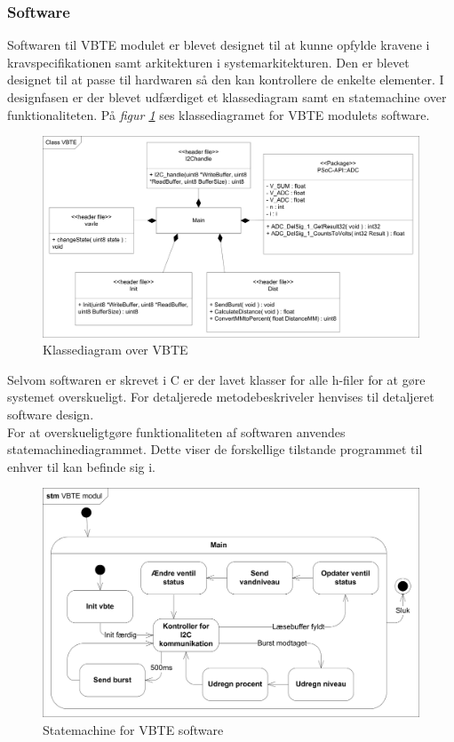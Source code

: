 \subsubsection{Software}
Softwaren til VBTE modulet er blevet designet til at kunne opfylde kravene i kravspecifikationen samt arkitekturen i systemarkitekturen. Den er blevet designet til at passe til hardwaren så den kan kontrollere de enkelte elementer. I designfasen er der blevet udfærdiget et klassediagram samt en statemachine over funktionaliteten. På \textit{figur \ref{fig:VBTEklasse} } ses klassediagramet for VBTE modulets software.
\begin{figure}[H]
\centering
\includegraphics[width=.8\textwidth]{billeder/ClassVBTE}
\caption{Klassediagram over VBTE}
\label{fig:VBTEklasse}
\end{figure}
Selvom softwaren er skrevet i C er der lavet klasser for alle h-filer for at gøre systemet overskueligt. For detaljerede metodebeskriveler henvises til detaljeret software design.\\
For at overskueligtgøre funktionaliteten af softwaren anvendes statemachinediagrammet. Dette viser de forskellige tilstande programmet til enhver til kan befinde sig i.
\begin{figure}[H]
\centering
\includegraphics[width=.8\textwidth]{billeder/STMVBTE}
\caption{Statemachine for VBTE software}
\end{figure}
